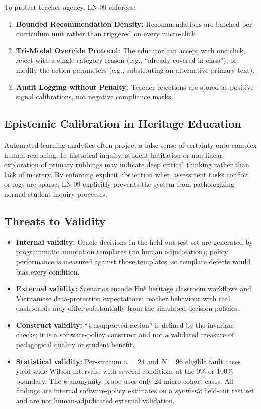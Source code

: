 \documentclass[11pt,a4paper]{article}
\begin{document}
To protect teacher agency, LN-09 enforces:
\begin{enumerate}
    \item \textbf{Bounded Recommendation Density:} Recommendations are batched per curriculum unit rather than triggered on every micro-click.
    \item \textbf{Tri-Modal Override Protocol:} The educator can accept with one click, reject with a single category reason (e.g., ``already covered in class''), or modify the action parameters (e.g., substituting an alternative primary text).
    \item \textbf{Audit Logging without Penalty:} Teacher rejections are stored as positive signal calibrations, not negative compliance marks.
\end{enumerate}

\subsection{Epistemic Calibration in Heritage Education}
Automated learning analytics often project a false sense of certainty onto complex human reasoning. In historical inquiry, student hesitation or non-linear exploration of primary rubbings may indicate deep critical thinking rather than lack of mastery. By enforcing explicit abstention when assessment tasks conflict or logs are sparse, LN-09 explicitly prevents the system from pathologizing normal student inquiry processes.

\subsection{Threats to Validity}

\begin{itemize}
    \item \textbf{Internal validity:} Oracle decisions in the held-out test set are generated by programmatic annotation templates (no human adjudication); policy performance is measured against those templates, so template defects would bias every condition.
    \item \textbf{External validity:} Scenarios encode Huế heritage classroom workflows and Vietnamese data-protection expectations; teacher behaviour with real dashboards may differ substantially from the simulated decision policies.
    \item \textbf{Construct validity:} ``Unsupported action'' is defined by the invariant checks; it is a software-policy construct and not a validated measure of pedagogical quality or student benefit.
    \item \textbf{Statistical validity:} Per-stratum $n=24$ and $N=96$ eligible fault cases yield wide Wilson intervals, with several conditions at the 0\% or 100\% boundary. The $k$-anonymity probe uses only 24 micro-cohort cases. All findings are internal software-policy estimates on a \emph{synthetic} held-out test set and are not human-adjudicated external validation.
\end{itemize}
\end{document}
